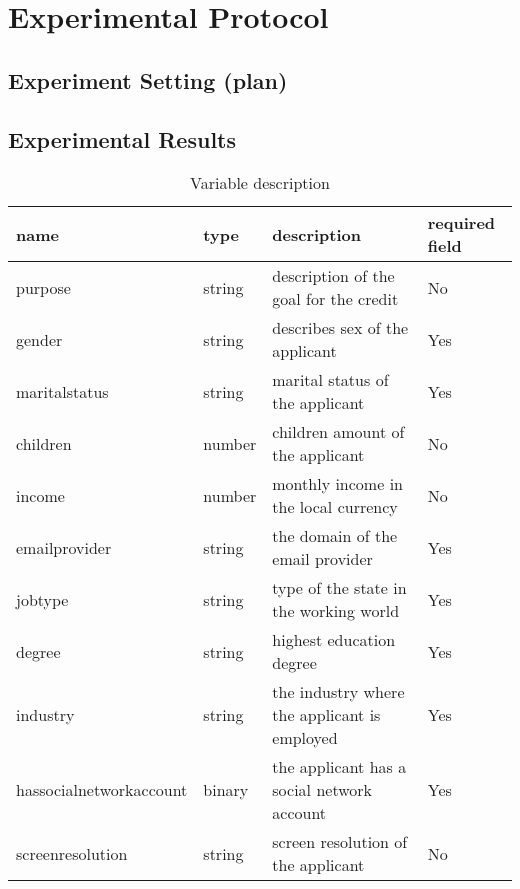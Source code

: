 \chapter{Experimental Protocol}


\section{Experiment Setting (plan)}
\section{Experimental Results}






\begin{table}[h!]
  \begin{center}
    \caption{Variable description}
    \label{tab:table1}
    \begin{tabular}{l|l|l|l}
    name & type & description & required field\\
      \hline
      purpose & string & description of the goal for the credit & No\\
      \hline
      gender & string & describes sex of the applicant  & Yes\\
      \hline
      maritalstatus & string & marital status of the applicant & Yes\\
      \hline
      children & number & children amount of the applicant & No\\
      \hline
      income & number & monthly income in the local currency & No\\ %
      \hline
       emailprovider & string & the domain of the email provider & Yes\\ %
       \hline
       jobtype & string & type of the state in the working world & Yes\\
        \hline
       degree & string & highest education degree & Yes\\
       \hline
       industry & string & the industry where the applicant is employed & Yes\\
       \hline
       hassocialnetworkaccount & binary & the applicant has a social network account & Yes\\ %
       \hline
        screenresolution & string & screen resolution of the applicant & No\\

\end{tabular}
\end{center}
\end{table}
